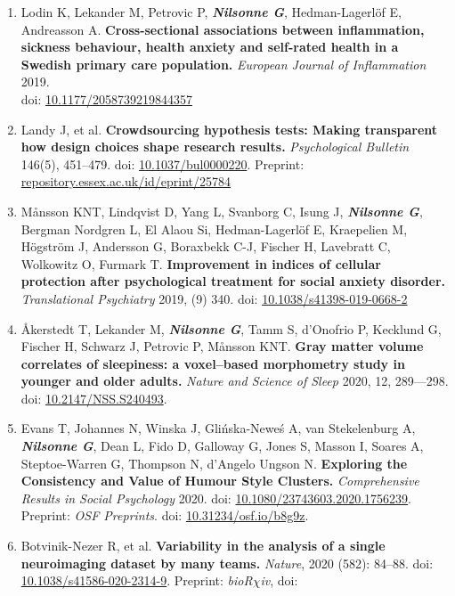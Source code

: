 \documentclass[10pt]{article}
\begin{document}
\begin{enumerate}[nolistsep]
\item Lodin K, Lekander M, Petrovic P, \textbf{\textit{Nilsonne G}}, Hedman-Lagerlöf E, Andreasson A. \textbf{Cross-sectional associations between inflammation, sickness behaviour, health anxiety and self-rated health in a Swedish primary care population.} \emph{European Journal of Inflammation} 2019.\\
doi: \href{http://doi.org/10.1177/2058739219844357}{10.1177/2058739219844357}
\item Landy J, et al. \textbf{Crowdsourcing hypothesis tests: Making transparent how design choices shape research results.} \emph{Psychological Bulletin} 146(5), 451–479. doi: \href{https://doi.org/10.1037/bul0000220}{10.1037/bul0000220}. Preprint: \href{http://repository.essex.ac.uk/id/eprint/25784}{repository.essex.ac.uk/id/eprint/25784}
\item Månsson KNT, Lindqvist D, Yang L, Svanborg C, Isung J, \textbf{\textit{Nilsonne G}}, Bergman Nordgren L, El Alaou Si, Hedman-Lagerlöf E, Kraepelien M, Högström J, Andersson G, Boraxbekk C-J, Fischer H, Lavebratt C, Wolkowitz O, Furmark T. \textbf{Improvement in indices of cellular protection after psychological treatment for social anxiety disorder.} \emph{Translational Psychiatry} 2019, (9) 340. doi: \href{http://doi.org/10.1038/s41398-019-0668-2}{10.1038/s41398-019-0668-2}
\item Åkerstedt T, Lekander M, \textbf{\textit{Nilsonne G}}, Tamm S, d'Onofrio P, Kecklund G, Fischer H, Schwarz J, Petrovic P, Månsson KNT. \textbf{Gray matter volume correlates of sleepiness: a voxel–based morphometry study in younger and older adults.} \emph{Nature and Science of Sleep} 2020, 12, 289—298. doi: \href{https://doi.org/10.2147/NSS.S240493}{10.2147/NSS.S240493}.
\item Evans T, Johannes N, Winska J, Glińska-Neweś A, van Stekelenburg A, \textbf{\textit{Nilsonne G}}, Dean L, Fido D, Galloway G, Jones S, Masson I, Soares A, Steptoe-Warren G, Thompson N, d'Angelo Ungson N. \textbf{Exploring the Consistency and Value of Humour Style Clusters.} \emph{Comprehensive Results in Social Psychology} 2020. doi: \href{https://doi.org/10.1080/23743603.2020.1756239}{10.1080/23743603.2020.1756239}. Preprint: \emph{OSF Preprints}. doi: \href{https://doi.org/10.31234/osf.io/b8g9z}{10.31234/osf.io/b8g9z}.
\item Botvinik-Nezer R, et al. \textbf{Variability in the analysis of a single neuroimaging dataset by many teams.} \emph{Nature}, 2020 (582): 84–88. doi:  \href{https://doi.org/10.1038/s41586-020-2314-9}{10.1038/s41586-020-2314-9}. Preprint: \textit{bioR$\chi$iv}, doi:\\

\end{enumerate}
\end{document}
